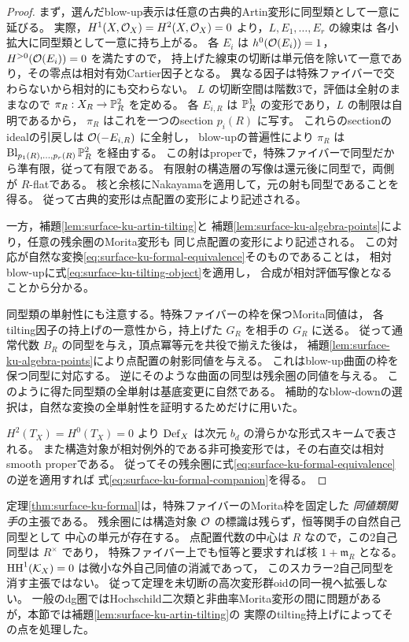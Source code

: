 \begin{proof}
まず，選んだblow-up表示は任意の古典的Artin変形に同型類として一意に延びる。
実際，$H^1(X,\mathcal O_X)=H^2(X,\mathcal O_X)=0$ より，$L,E_1,\ldots,E_r$ の線束は
各小拡大に同型類として一意に持ち上がる。
各 $E_i$ は $h^0(\mathcal O(E_i))=1$，$H^{>0}(\mathcal O(E_i))=0$ を満たすので，
持上げた線束の切断は単元倍を除いて一意であり，その零点は相対有効Cartier因子となる。
異なる因子は特殊ファイバーで交わらないから相対的にも交わらない。
$L$ の切断空間は階数3で，評価は全射のままなので
$\pi_R:X_R\to\mathbb P^2_R$ を定める。
各 $E_{i,R}$ は $\mathbb P^1_R$ の変形であり，$L$ の制限は自明であるから，
$\pi_R$ はこれを一つのsection $p_i(R)$ に写す。
これらのsectionのidealの引戻しは $\mathcal O(-E_{i,R})$ に全射し，
blow-upの普遍性により $\pi_R$ は
$\operatorname{Bl}_{p_1(R),\ldots,p_r(R)}\mathbb P^2_R$ を経由する。
この射はproperで，特殊ファイバーで同型だから準有限，従って有限である。
有限射の構造層の写像は還元後に同型で，両側が $R$-flatである。
核と余核にNakayamaを適用して，元の射も同型であることを得る。
従って古典的変形は点配置の変形により記述される。

一方，補題\ref{lem:surface-ku-artin-tilting}と
補題\ref{lem:surface-ku-algebra-points}により，任意の残余圏のMorita変形も
同じ点配置の変形により記述される。
この対応が自然な変換\eqref{eq:surface-ku-formal-equivalence}そのものであることは，
相対blow-upに式\eqref{eq:surface-ku-tilting-object}を適用し，
合成が相対評価写像となることから分かる。

同型類の単射性にも注意する。特殊ファイバーの枠を保つMorita同値は，
各tilting因子の持上げの一意性から，持上げた $G_R$ を相手の $G_R$ に送る。
従って通常代数 $B_R$ の同型を与え，頂点冪等元を共役で揃えた後は，
補題\ref{lem:surface-ku-algebra-points}により点配置の射影同値を与える。
これはblow-up曲面の枠を保つ同型に対応する。
逆にそのような曲面の同型は残余圏の同値を与える。
このように得た同型類の全単射は基底変更に自然である。
補助的なblow-downの選択は，自然な変換の全単射性を証明するためだけに用いた。

$H^2(T_X)=H^0(T_X)=0$ より $\operatorname{Def}_X$ は次元 $b_d$ の滑らかな形式スキームで表される。
また構造対象が相対例外的である非可換変形では，その右直交は相対smooth properである。
従ってその残余圏に式\eqref{eq:surface-ku-formal-equivalence}の逆を適用すれば
式\eqref{eq:surface-ku-formal-companion}を得る。
\end{proof}

\begin{remark}[枠と高次自己同型]
定理\ref{thm:surface-ku-formal}は，特殊ファイバーのMorita枠を固定した
\emph{同値類関手}の主張である。
残余圏には構造対象 $\mathcal O$ の標識は残らず，恒等関手の自然自己同型として
中心の単元が存在する。
点配置代数の中心は $R$ なので，この2自己同型は $R^\times$ であり，
特殊ファイバー上でも恒等と要求すれば核 $1+\mathfrak m_R$ となる。
$\operatorname{HH}^1(\mathcal K_X)=0$ は微小な外自己同値の消滅であって，
このスカラー2自己同型を消す主張ではない。
従って定理を未切断の高次変形群oidの同一視へ拡張しない。
一般のdg圏ではHochschild二次類と非曲率Morita変形の間に問題がある
\cite{KellerLowen2009}が，本節では補題\ref{lem:surface-ku-artin-tilting}の
実際のtilting持上げによってその点を処理した。
\end{remark}

